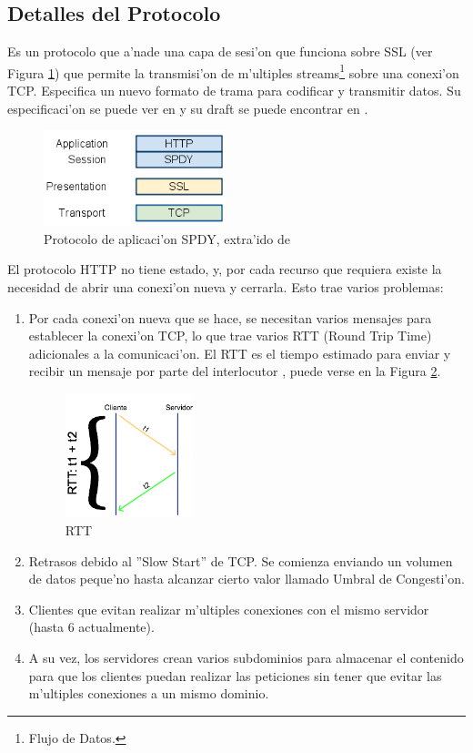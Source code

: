 \subsection{Detalles del Protocolo}

Es un protocolo que a'nade una capa de sesi'on que funciona sobre SSL (ver Figura \ref{capaSPDY}) que permite la transmisi'on de m'ultiples streams\footnote{Flujo de Datos.} sobre una conexi'on TCP. Especifica un nuevo formato de trama para codificar y transmitir datos.
Su especificaci'on se puede ver en \citep{spdyWhitepaper} y su draft se puede encontrar en \citep{spdyDraft}.

\begin{figure}[h]
  	\centering
	\includegraphics[width=200px]{img/capaSPDY}
	\caption{\small Protocolo de aplicaci'on SPDY, extra'ido de \citep{spdyWhitepaper}}
	\label{capaSPDY}
\end{figure}

El protocolo HTTP no tiene estado, y, por cada recurso que requiera existe la necesidad de abrir una conexi'on nueva y cerrarla. Esto trae varios problemas:
\begin{enumerate}
\item Por cada conexi'on nueva que se hace, se necesitan varios mensajes para establecer la conexi'on TCP, lo que trae varios RTT (Round Trip Time) adicionales a la comunicaci'on. El RTT es el tiempo estimado para enviar y recibir un mensaje por parte del interlocutor \citep{tcpipIluistrated}, puede verse en la Figura \ref{rtt}.

\begin{figure}[h!]
  	\centering
	\includegraphics[width=140px]{img/rtt}
	\caption{\small RTT}
	\label{rtt}
\end{figure}

\item Retrasos debido al ''Slow Start'' de TCP. Se comienza enviando un volumen de datos peque'no hasta alcanzar cierto valor llamado Umbral de Congesti'on.
\item Clientes que evitan realizar m'ultiples conexiones con el mismo servidor (hasta 6 actualmente).
\item  A su vez, los servidores crean varios subdominios para almacenar el contenido para que los clientes puedan realizar las peticiones sin tener que evitar las m'ultiples conexiones a un mismo dominio.
\end{enumerate}

